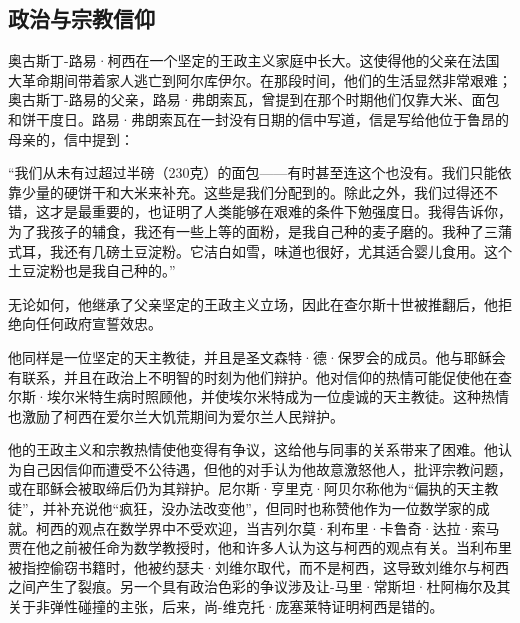 \subsection{政治与宗教信仰}  
奥古斯丁-路易·柯西在一个坚定的王政主义家庭中长大。这使得他的父亲在法国大革命期间带着家人逃亡到阿尔库伊尔。在那段时间，他们的生活显然非常艰难；奥古斯丁-路易的父亲，路易·弗朗索瓦，曾提到在那个时期他们仅靠大米、面包和饼干度日。路易·弗朗索瓦在一封没有日期的信中写道，信是写给他位于鲁昂的母亲的，信中提到：

“我们从未有过超过半磅（230克）的面包——有时甚至连这个也没有。我们只能依靠少量的硬饼干和大米来补充。这些是我们分配到的。除此之外，我们过得还不错，这才是最重要的，也证明了人类能够在艰难的条件下勉强度日。我得告诉你，为了我孩子的辅食，我还有一些上等的面粉，是我自己种的麦子磨的。我种了三蒲式耳，我还有几磅土豆淀粉。它洁白如雪，味道也很好，尤其适合婴儿食用。这个土豆淀粉也是我自己种的。”

无论如何，他继承了父亲坚定的王政主义立场，因此在查尔斯十世被推翻后，他拒绝向任何政府宣誓效忠。

他同样是一位坚定的天主教徒，并且是圣文森特·德·保罗会的成员。他与耶稣会有联系，并且在政治上不明智的时刻为他们辩护。他对信仰的热情可能促使他在查尔斯·埃尔米特生病时照顾他，并使埃尔米特成为一位虔诚的天主教徒。这种热情也激励了柯西在爱尔兰大饥荒期间为爱尔兰人民辩护。

他的王政主义和宗教热情使他变得有争议，这给他与同事的关系带来了困难。他认为自己因信仰而遭受不公待遇，但他的对手认为他故意激怒他人，批评宗教问题，或在耶稣会被取缔后仍为其辩护。尼尔斯·亨里克·阿贝尔称他为“偏执的天主教徒”，并补充说他“疯狂，没办法改变他”，但同时也称赞他作为一位数学家的成就。柯西的观点在数学界中不受欢迎，当吉列尔莫·利布里·卡鲁奇·达拉·索马贾在他之前被任命为数学教授时，他和许多人认为这与柯西的观点有关。当利布里被指控偷窃书籍时，他被约瑟夫·刘维尔取代，而不是柯西，这导致刘维尔与柯西之间产生了裂痕。另一个具有政治色彩的争议涉及让-马里·常斯坦·杜阿梅尔及其关于非弹性碰撞的主张，后来，尚-维克托·庞塞莱特证明柯西是错的。
